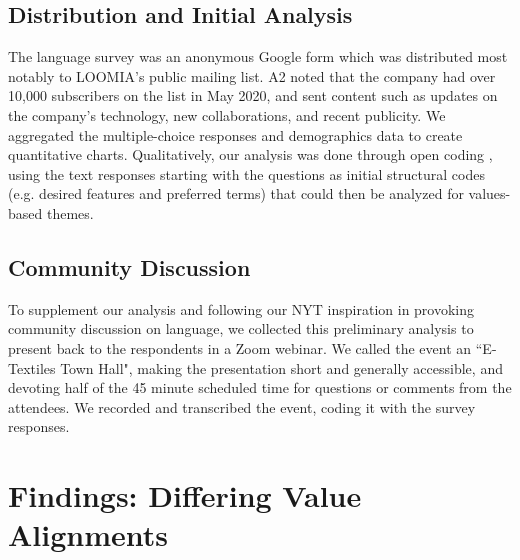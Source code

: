 \subsection{Distribution and Initial Analysis}

The language survey was an anonymous Google form which was distributed most notably to LOOMIA's public mailing list. A2 noted that the company had over 10,000 subscribers on the list in May 2020, and sent content such as updates on the company's technology, new collaborations, and recent publicity.
We aggregated the multiple-choice responses and demographics data to create quantitative charts. Qualitatively, our analysis was done through open coding \cite{denzin_sage_2005}, using the text responses starting with the questions as initial structural codes (e.g. desired features and preferred terms) that could then be analyzed for values-based themes. 

\subsection{Community Discussion}

To supplement our analysis and following our NYT inspiration in provoking community discussion on language, we collected this preliminary analysis to present back to the respondents in a Zoom webinar. We called the event an ``E-Textiles Town Hall", making the presentation short and generally accessible, and devoting half of the 45 minute scheduled time for questions or comments from the attendees. We recorded and transcribed the event, coding it with the survey responses. %

\section{Findings: Differing Value Alignments}

